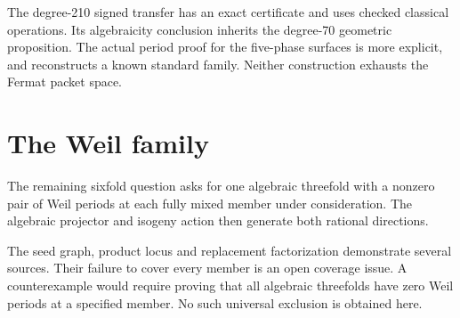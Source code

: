 The degree-210 signed transfer has an exact certificate and uses checked classical operations. Its algebraicity conclusion inherits the degree-70 geometric proposition. The actual period proof for the five-phase surfaces is more explicit, and reconstructs a known standard family. Neither construction exhausts the Fermat packet space.

\section{The Weil family}
The remaining sixfold question asks for one algebraic threefold with a nonzero pair of Weil periods at each fully mixed member under consideration. The algebraic projector and isogeny action then generate both rational directions.

The seed graph, product locus and replacement factorization demonstrate several sources. Their failure to cover every member is an open coverage issue. A counterexample would require proving that all algebraic threefolds have zero Weil periods at a specified member. No such universal exclusion is obtained here.
